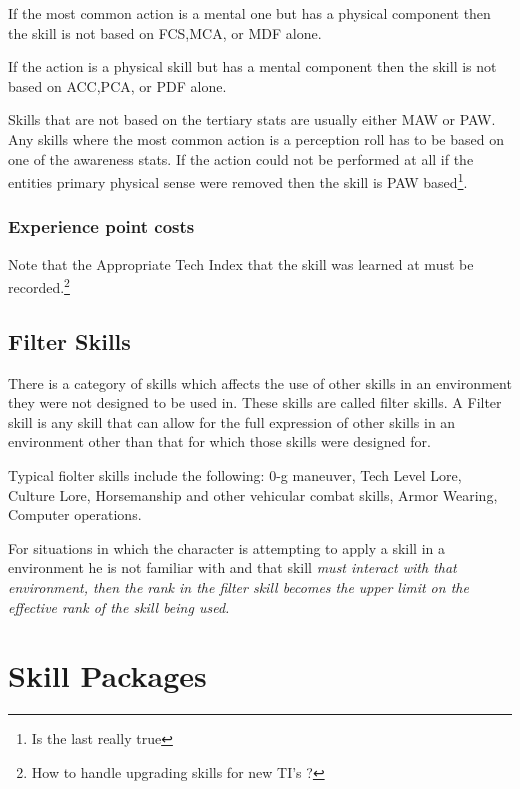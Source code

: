 If the most common action is a mental one but has a physical component then
the skill is not based on FCS,MCA, or MDF alone.

If the action is a physical skill but has a mental component then the
skill is not based on ACC,PCA, or PDF alone.

Skills that are not based on the tertiary stats are usually either MAW
or PAW. Any skills where the most common action is a perception roll has
to be based on one of the awareness stats. If the action could not be
performed at all if the entities primary physical sense were removed
then the skill is PAW based\footnote{Is the last really true}. 



\subsection{Experience point costs}



Note that the Appropriate Tech Index that the skill was learned at 
must be recorded.\footnote{ How to handle upgrading skills for new TI's ?}

\section{Filter Skills}

There is a category of skills which affects the use of other skills 
in an environment they were not designed to be used in. These skills 
are called filter skills. A Filter skill is any skill that can allow 
for the full expression of other skills in an environment other than 
that for which those skills were designed for.

Typical fiolter skills include the following: 0-g maneuver, Tech 
Level Lore, Culture Lore, Horsemanship and other vehicular combat 
skills, Armor Wearing, Computer operations.

For situations in which the character is attempting to apply a skill 
in a environment he is not familiar with and that skill \em{ must }
interact with that environment, then the rank in the filter skill 
becomes the upper limit on the effective rank of the skill being 
used.

\chapter{Skill Packages}

